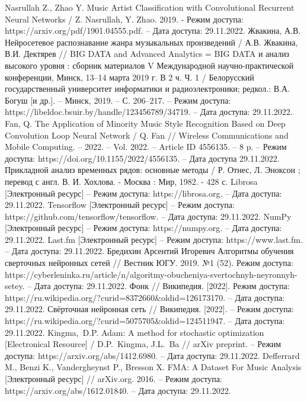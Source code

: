 \begin{thebibliography}{99}
 Nasrullah Z., Zhao Y. Music Artist Classification with Convolutional Recurrent Neural Networks / Z. Nasrullah, Y. Zhao. 2019. - Режим доступа: https://arxiv.org/pdf/1901.04555.pdf. -- Дата доступа: 29.11.2022.
 Жвакина, А.В. Нейросетевое распознавание жанра музыкальных произведений / А.В.  Жвакина, В.И. Дектярев // BIG DATA and Advanced Analytics = BIG DATA и анализ высокого уровня : сборник материалов V Международной научно-практической конференции, Минск, 13–14 марта 2019 г. В 2 ч. Ч. 1 / Белорусский государственный университет информатики и радиоэлектроники; редкол.: В.А. Богуш [и др.]. – Минск, 2019. – С. 206–217. – Режим доступа: https://libeldoc.bsuir.by/handle/123456789/34719. -- Дата доступа: 29.11.2022.
 Fan, Q. The Application of Minority Music Style Recognition Based on Deep Convolution Loop Neural Network / Q. Fan // Wireless Communications and Mobile Computing. – 2022. – Vol. 2022. – Article ID 4556135. – 8 p. – Режим доступа: https://doi.org/10.1155/2022/4556135. -- Дата доступа 29.11.2022.
 Прикладной анализ временных рядов: основные методы / Р. Отнес, Л. Эноксон ; перевод с англ. В. И. Хохлова. - Москва : Мир, 1982. - 428 с.
 Librosa [Электронный ресурс] -- Режим доступа: https://librosa.org. -- Дата доступа: 29.11.2022.
 Tensorflow [Электронный ресурс] -- Режим доступа: https://github.com/tensorflow/tensorflow. -- Дата доступа: 29.11.2022.
 NumPy [Электронный ресурс] -- Режим доступа: https://numpy.org. -- Дата доступа: 29.11.2022.
 Last.fm [Электронный ресурс] -- Режим доступа: https://www.last.fm. -- Дата доступа: 29.11.2022.
 Бредихин Арсентий Игоревич Алгоритмы обучения сверточных нейронных сетей // Вестник ЮГУ. 2019. №1 (52). Режим доступа: https://cyberleninka.ru/article/n/algoritmy-obucheniya-svertochnyh-neyronnyh-setey. -- Дата доступа: 29.11.2022.
 Фонк // Википедия. [2022]. Режим доступа: https://ru.wikipedia.org/?curid=8372660\&oldid=126173170. -- Дата доступа: 29.11.2022.
 Свёрточная нейронная сеть // Википедия. [2022]. -- Режим доступа: https://ru.wikipedia.org/?curid=5075705\&oldid=124511947. -- Дата доступа: 29.11.2022.
 Kingma, D.P. Adam: A method for stochastic optimization [Electronical Resource] / D.P. Kingma, J.L. Ba // arXiv preprint. – Режим доступа: https://arxiv.org/abs/1412.6980. -- Дата доступа: 29.11.2022.
 Defferrard M., Benzi K., Vandergheynst P., Bresson X. FMA: A Dataset For Music Analysis [Электронный ресурс] // arXiv.org. 2016. -- Режим доступа: https://arxiv.org/abs/1612.01840. -- Дата доступа: 29.11.2022.

\end{thebibliography}
